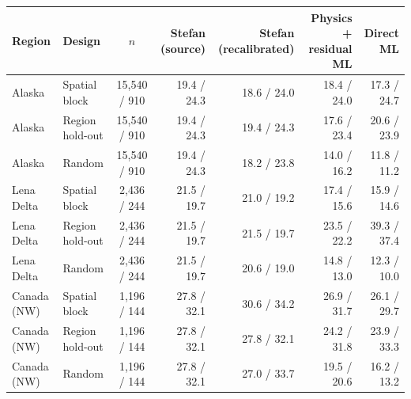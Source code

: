 \begin{tabular}{@{}llcrrrr@{}}
\toprule
Region & Design & $n$ & Stefan (source) & Stefan (recalibrated) & Physics + residual ML & Direct ML \\
\midrule
Alaska & Spatial block & 15,540 / 910 & 19.4 / 24.3 & 18.6 / 24.0 & 18.4 / 24.0 & 17.3 / 24.7 \\
Alaska & Region hold-out & 15,540 / 910 & 19.4 / 24.3 & 19.4 / 24.3 & 17.6 / 23.4 & 20.6 / 23.9 \\
Alaska & Random & 15,540 / 910 & 19.4 / 24.3 & 18.2 / 23.8 & 14.0 / 16.2 & 11.8 / 11.2 \\
Lena Delta & Spatial block & 2,436 / 244 & 21.5 / 19.7 & 21.0 / 19.2 & 17.4 / 15.6 & 15.9 / 14.6 \\
Lena Delta & Region hold-out & 2,436 / 244 & 21.5 / 19.7 & 21.5 / 19.7 & 23.5 / 22.2 & 39.3 / 37.4 \\
Lena Delta & Random & 2,436 / 244 & 21.5 / 19.7 & 20.6 / 19.0 & 14.8 / 13.0 & 12.3 / 10.0 \\
Canada (NW) & Spatial block & 1,196 / 144 & 27.8 / 32.1 & 30.6 / 34.2 & 26.9 / 31.7 & 26.1 / 29.7 \\
Canada (NW) & Region hold-out & 1,196 / 144 & 27.8 / 32.1 & 27.8 / 32.1 & 24.2 / 31.8 & 23.9 / 33.3 \\
Canada (NW) & Random & 1,196 / 144 & 27.8 / 32.1 & 27.0 / 33.7 & 19.5 / 20.6 & 16.2 / 13.2 \\
\bottomrule
\end{tabular}
